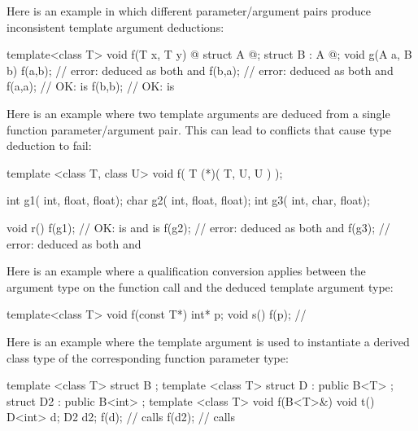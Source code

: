 \pnum
\begin{example}
Here is an example in which different parameter/argument pairs produce
inconsistent template argument deductions:
\begin{codeblock}
template<class T> void f(T x, T y) { @\commentellip@ }
struct A { @\commentellip@ };
struct B : A { @\commentellip@ };
void g(A a, B b) {
  f(a,b);           // error:  deduced as both  and 
  f(b,a);           // error:  deduced as both  and 
  f(a,a);           // OK:  is 
  f(b,b);           // OK:  is 
}
\end{codeblock}

Here is an example where two template arguments are deduced from a
single function parameter/argument pair.
This can lead to conflicts
that cause type deduction to fail:
\begin{codeblock}
template <class T, class U> void f(  T (*)( T, U, U )  );

int g1( int, float, float);
char g2( int, float, float);
int g3( int, char, float);

void r() {
  f(g1);            // OK:  is  and  is 
  f(g2);            // error:  deduced as both  and 
  f(g3);            // error:  deduced as both  and 
}
\end{codeblock}

Here is an example where a qualification conversion applies between the
argument type on the function call and the deduced template argument type:
\begin{codeblock}
template<class T> void f(const T*) { }
int* p;
void s() {
  f(p);             // 
}
\end{codeblock}

Here is an example where the template argument is used to instantiate
a derived class type of the corresponding function parameter type:
\begin{codeblock}
template <class T> struct B { };
template <class T> struct D : public B<T> {};
struct D2 : public B<int> {};
template <class T> void f(B<T>&) {}
void t() {
  D<int> d;
  D2     d2;
  f(d);             // calls 
  f(d2);            // calls 
}
\end{codeblock}
\end{example}


